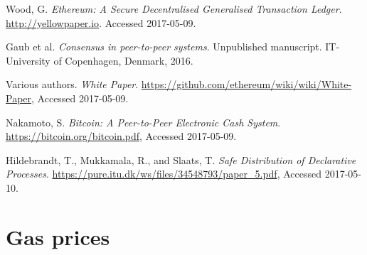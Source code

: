 \documentclass{article}
\begin{document}
	\pagebreak
	
	\begin{thebibliography}{99}

		Wood, G.
		\textit{Ethereum: A Secure Decentralised Generalised Transaction Ledger}. 
		\url{http://yellowpaper.io}.
		Accessed 2017-05-09.

		Gaub et al.
		\textit{Consensus in peer-to-peer systems}.
		Unpublished manuscript.
		IT-University of Copenhagen,
		Denmark,
		2016.

		Various authors.
		\textit{White Paper}.
		\url{https://github.com/ethereum/wiki/wiki/White-Paper},
		Accessed 2017-05-09.

		Nakamoto, S.
		\textit{Bitcoin: A Peer-to-Peer Electronic Cash System}.
		\url{https://bitcoin.org/bitcoin.pdf},
		Accessed 2017-05-09.

		Hildebrandt, T., Mukkamala, R., and  Slaats, T.
		\textit{Safe Distribution of Declarative Processes}.
		\url{https://pure.itu.dk/ws/files/34548793/paper_5.pdf},
		Accessed 2017-05-10.

	\end{thebibliography}

	\clearpage


	\appendix

	\section{Gas prices}
		\label{app:gas-prices}
\end{document}
